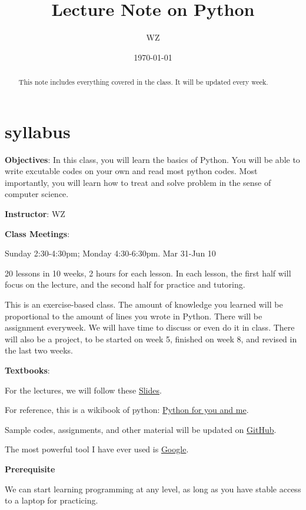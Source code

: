 \documentclass[aps,prb,12pt,tightenlines,%
notitlepage,longbibliography]{revtex4-1}
\begin{document}
\title{Lecture Note on Python}
\author{WZ}
\date{\today}
\begin{abstract}
  This note includes everything covered in the class. It will be
  updated every week.
\end{abstract}
\maketitle

\section{syllabus}
\textbf{Objectives}: In this class, you will learn the basics of
Python. You will be able to write excutable codes on your own and read
most python codes. Most importantly, you will learn how to treat and
solve problem in the sense of computer science.


\textbf{Instructor}: WZ

\textbf{Class Meetings}:

Sunday 2:30-4:30pm; Monday 4:30-6:30pm. Mar 31-Jun 10

20 lessons in 10 weeks, 2 hours for each lesson. In each lesson, the
first half will focus on the lecture, and the second half for practice
and tutoring.

This is an exercise-based class. The amount of knowledge you learned
will be proportional to the amount of lines you wrote in Python. There
will be assignment everyweek. We will have time to discuss or even do
it in class. There will also be a project, to be started
on week 5, finished on week 8, and revised in the last two weeks. 

\textbf{Textbooks}:

For the lectures, we will follow these
\href{http://uwpce-pythoncert.github.io/IntroPython2016a/session01.html}{Slides}.

For reference, this is a wikibook of python: 
\href{https://pymbook.readthedocs.io/en/latest/index.html}{Python for
  you and me}.

Sample codes, assignments, and other material will be updated on 
\href{https://github.com/WeileiZeng/python-tutorial}{GitHub}.

The most powerful tool I have ever used is \href{https://www.google.com/}{Google}.

\textbf{Prerequisite}

We can start learning programming at any level, as long as you have
stable access to a laptop for practicing.
\end{document}
